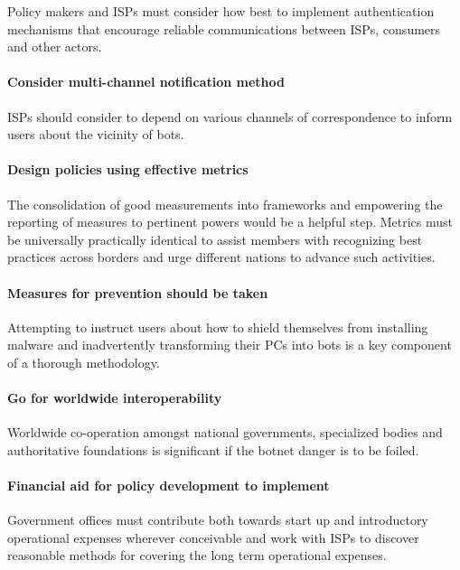 Policy makers and ISPs must consider how best to implement authentication mechanisms that encourage reliable communications between ISPs, consumers and other actors.

\paragraph{Consider multi-channel notification method}

ISPs should consider to depend on various channels of correspondence to inform users about the vicinity of bots.

\paragraph{Design policies using effective metrics}

The consolidation of good measurements into frameworks and empowering the reporting of measures to pertinent powers would be a helpful step. Metrics must be universally practically identical to assist members with recognizing best practices across borders and urge different nations to advance such activities.

\paragraph{Measures for prevention should be taken}

Attempting to instruct users about how to shield themselves from installing malware and inadvertently transforming their PCs into bots is a key component of a thorough methodology.

\paragraph{Go for worldwide interoperability}

Worldwide co-operation amongst national governments, specialized bodies and authoritative foundations is significant if the botnet danger is to be foiled.

\paragraph{Financial aid for policy development to implement}

Government offices must contribute both towards start up and introductory operational expenses wherever conceivable and work with ISPs to discover reasonable methods for covering the long term operational expenses.



